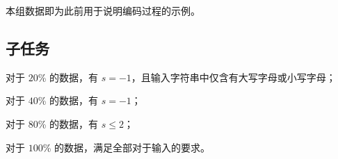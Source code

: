 \examplebox*{}{}

本组数据即为此前用于说明编码过程的示例。

\subsection*{子任务}

对于 $20$\% 的数据，有 $s=-1$，且输入字符串中仅含有大写字母或小写字母；

对于 $40$\% 的数据，有 $s=-1$；

对于 $80$\% 的数据，有 $s\le 2$；

对于 $100$\% 的数据，满足全部对于输入的要求。